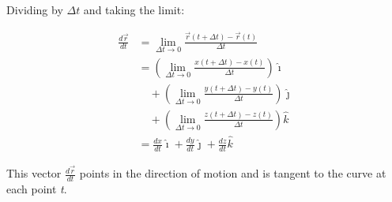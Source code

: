 Dividing by \(\Delta t\) and taking the limit:

\begin{align*}
    \frac{d\vec{r}}{dt} &= \lim_{\Delta t \to 0} \frac{\vec{r}(t + \Delta t) - \vec{r}(t)}{\Delta t} \\
    &= \left( \lim_{\Delta t \to 0} \frac{x(t + \Delta t) - x(t)}{\Delta t} \right) \hat{\imath} \\
    &\quad + \left( \lim_{\Delta t \to 0} \frac{y(t + \Delta t) - y(t)}{\Delta t} \right) \hat{\jmath} \\
    &\quad + \left( \lim_{\Delta t \to 0} \frac{z(t + \Delta t) - z(t)}{\Delta t} \right) \hat{k} \\
    &= \frac{dx}{dt} \hat{\imath} + \frac{dy}{dt} \hat{\jmath} + \frac{dz}{dt} \hat{k}
\end{align*}

This vector \(\frac{d\vec{r}}{dt}\) points in the direction of motion and is tangent to the curve at 
each point \emph{t}.

